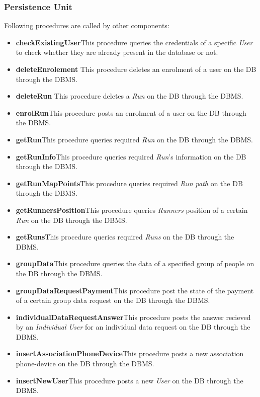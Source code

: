\subsubsection{Persistence Unit}
Following procedures are called by other components:
\begin{itemize}
  \item \textbf{checkExistingUser}\quad This procedure queries the credentials of a specific \textit{User} to check whether they are already present in the database or not.
  \item \textbf{deleteEnrolement} \quad This procedure deletes an enrolment of a user on the DB through the DBMS.
  \item \textbf{deleteRun} \quad This procedure deletes a \textit{Run} on the DB through the DBMS.
  \item \textbf{enrolRun}\quad This procedure posts an enrolment of a user on the DB through the DBMS.
  \item \textbf{getRun}\quad This procedure queries required \textit{Run} on the DB through the DBMS.
  \item \textbf{getRunInfo}\quad This procedure queries required \textit{Run}'s information on the DB through the DBMS.
  \item \textbf{getRunMapPoints}\quad This procedure queries required \textit{Run path} on the DB through the DBMS.
  \item \textbf{getRunnersPosition}\quad This procedure queries \textit{Runners} position of a certain \textit{Run} on the DB through the DBMS.
  \item \textbf{getRuns}\quad This procedure queries required \textit{Runs} on the DB through the DBMS.
  \item \textbf{groupData}\quad This procedure queries the data of a specified group of people on the DB through the DBMS.
  \item \textbf{groupDataRequestPayment}\quad This procedure post the state of the payment of a certain group data request on the DB through the DBMS.
  \item \textbf{individualDataRequestAnswer}\quad This procedure posts the answer recieved by an \textit{Individual User} for an individual data request on the DB through the DBMS.
  \item \textbf{insertAssociationPhoneDevice}\quad This procedure posts a new association phone-device on the DB through the DBMS.
  \item \textbf{insertNewUser}\quad This procedure posts a new \textit{User} on the DB through the DBMS.

\end{itemize}
